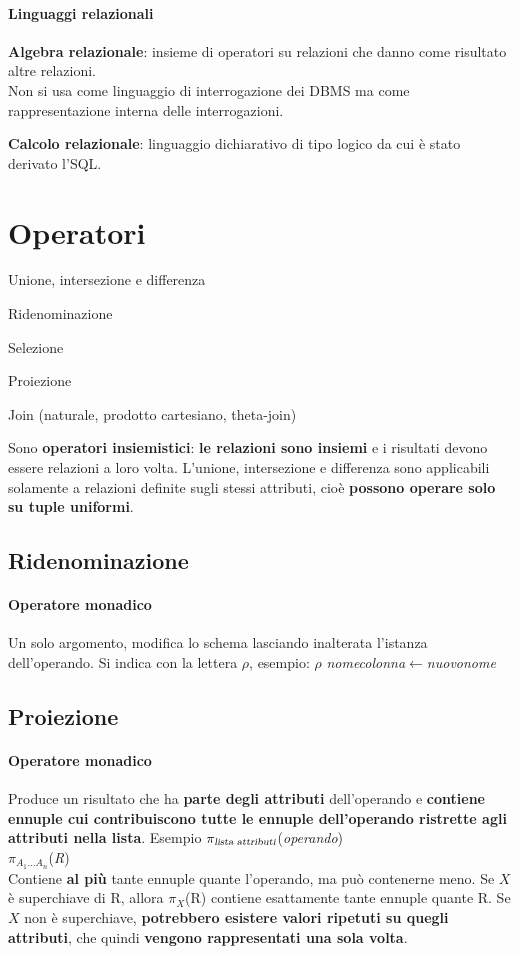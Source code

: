 \documentclass[10pt]{book}
\begin{document}
\paragraph{Linguaggi relazionali}
\begin{list}{}{}
	\item \textbf{Algebra relazionale}: insieme di operatori su relazioni che danno come risultato altre relazioni.\\
	Non si usa come linguaggio di interrogazione dei DBMS ma come rappresentazione interna delle interrogazioni.
	\item \textbf{Calcolo relazionale}: linguaggio dichiarativo di tipo logico da cui è stato derivato l'SQL.
\end{list}
\section{Operatori}
\begin{list}{}{}
	\item Unione, intersezione e differenza
	\item Ridenominazione
	\item Selezione
	\item Proiezione
	\item Join (naturale, prodotto cartesiano, theta-join)
\end{list}
Sono \textbf{operatori insiemistici}: \textbf{le relazioni sono insiemi} e i risultati devono essere relazioni a loro volta. L'unione, intersezione e differenza sono applicabili solamente a relazioni definite sugli stessi attributi, cioè \textbf{possono operare solo su tuple uniformi}.
\subsection{Ridenominazione}
\paragraph{Operatore monadico} Un solo argomento, modifica lo schema lasciando inalterata l'istanza dell'operando. Si indica con la lettera $\rho$, esempio: $\rho$ 
\textit{nomecolonna}$\leftarrow$\textit{nuovonome}
\subsection{Proiezione}
\paragraph{Operatore monadico} Produce un risultato che ha \textbf{parte degli attributi} dell'operando e \textbf{contiene ennuple cui contribuiscono tutte le ennuple dell'operando ristrette agli attributi nella lista}. Esempio $\pi_{\textsl{lista attributi}}$(\textit{operando})\\
$\pi_{A_1\ldots A_n}$(\textit{R})\\
Contiene \textbf{al più} tante ennuple quante l'operando, ma può contenerne meno. Se $X$ è superchiave di R, allora $\pi_X$(R) contiene esattamente tante ennuple quante R. Se $X$ non è superchiave, \textbf{potrebbero esistere valori ripetuti su quegli attributi}, che quindi \textbf{vengono rappresentati una sola volta}.
\pagebreak
\end{document}
